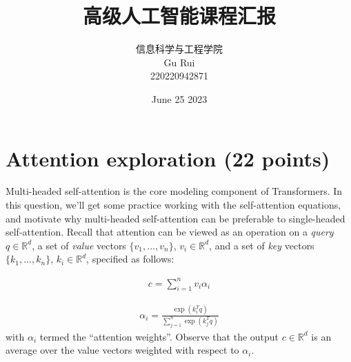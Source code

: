 \documentclass[letterpaper,12pt]{article}
\begin{document}
	
	
	\title{\songti {}高级人工智能课程汇报}
	\author{信息科学与工程学院 \\ \textrm{Gu Rui} \\ 220220942871}
	\date{\textrm{June 25  2023}}
	\maketitle
	
	\renewcommand{\figurename}{Figure} %
	\renewcommand{\contentsname}{Contents}
	\renewcommand{\tablename}{Table}
	\tableofcontents  %
	
	\section{Attention exploration (22 points)}
	
	\noindent Multi-headed self-attention is the core modeling component of Transformers. In this question, we'll get some practice working with the self-attention equations, and motivate why multi-headed self-attention can be preferable to single-headed self-attention.
	Recall that attention can be viewed as an operation on a \textit{query} $q \in \mathbb{R}^d$, a set of \textit{value} vectors $\{v_1, . . . , v_n \}$, $v_i \in
	\mathbb{R}^d$, and a set of \textit{key} vectors $\{k_1, . . . , k_n\}$, $k_i \in \mathbb{R}^d$, specified as follows:
	
	\begin{equation}
		\begin{aligned}
			c = \sum_{i=1}^{n} v_{i}\alpha_{i}
		\end{aligned}
		\label{eq: Attention_formula_1}
	\end{equation}
	
	\begin{equation}
		\begin{aligned}
			\alpha_{i} = \frac{\exp(k_{i}^{T}q)}{\sum_{j=1}^{n} \exp(k_{j}^{T}q)}
		\end{aligned}
		\label{eq: Attention_formula_2}
	\end{equation}
	with $α_i$ termed the “attention weights”. Observe that the output $c \in \mathbb{R}^d$
	is an average over the value vectors weighted with respect to $α_i$.
	
\end{document}
